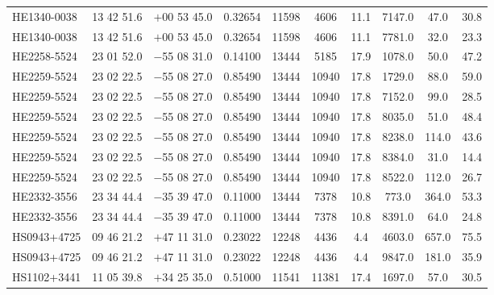 \begin{landscape}
\begin{center}
\begin{longtable}{l c c c c c c c c c}
HE1340-0038  &             13 42 51.6  &         $+$00 53 45.0  &       0.32654  & 11598  &   4606  &       11.1  &      7147.0  &  47.0  &   30.8  \\
HE1340-0038  &             13 42 51.6  &         $+$00 53 45.0  &       0.32654  & 11598  &   4606  &       11.1  &      7781.0  &  32.0  &   23.3  \\
HE2258-5524  &             23 01 52.0  &         $-$55 08 31.0  &       0.14100  & 13444  &   5185  &       17.9  &      1078.0  &  50.0  &   47.2  \\
HE2259-5524  &             23 02 22.5  &         $-$55 08 27.0  &       0.85490  & 13444  &   10940  &      17.8  &      1729.0  &  88.0  &   59.0  \\
HE2259-5524  &             23 02 22.5  &         $-$55 08 27.0  &       0.85490  & 13444  &   10940  &      17.8  &      7152.0  &  99.0  &   28.5  \\
HE2259-5524  &             23 02 22.5  &         $-$55 08 27.0  &       0.85490  & 13444  &   10940  &      17.8  &      8035.0  &  51.0  &   48.4  \\
HE2259-5524  &             23 02 22.5  &         $-$55 08 27.0  &       0.85490  & 13444  &   10940  &      17.8  &      8238.0  &  114.0  &  43.6  \\
HE2259-5524  &             23 02 22.5  &         $-$55 08 27.0  &       0.85490  & 13444  &   10940  &      17.8  &      8384.0  &  31.0  &   14.4  \\
HE2259-5524  &             23 02 22.5  &         $-$55 08 27.0  &       0.85490  & 13444  &   10940  &      17.8  &      8522.0  &  112.0  &  26.7  \\
HE2332-3556  &             23 34 44.4  &         $-$35 39 47.0  &       0.11000  & 13444  &   7378  &       10.8  &      773.0  &   364.0  &  53.3  \\
HE2332-3556  &             23 34 44.4  &         $-$35 39 47.0  &       0.11000  & 13444  &   7378  &       10.8  &      8391.0  &  64.0  &   24.8  \\
HS0943+4725  &             09 46 21.2  &         $+$47 11 31.0  &       0.23022  & 12248  &   4436  &       4.4  &       4603.0  &  657.0  &  75.5  \\
HS0943+4725  &             09 46 21.2  &         $+$47 11 31.0  &       0.23022  & 12248  &   4436  &       4.4  &       9847.0  &  181.0  &  35.9  \\
HS1102+3441  &             11 05 39.8  &         $+$34 25 35.0  &       0.51000  & 11541  &   11381  &      17.4  &      1697.0  &  57.0  &   30.5  \\

\end{longtable}
\end{center}
\end{landscape}

